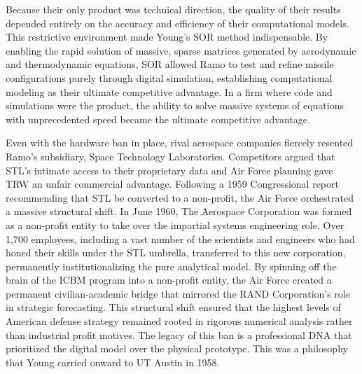 Because their only product was technical direction, the quality of their results depended entirely on the accuracy and efficiency of their computational models. This restrictive environment made Young's SOR method indispensable. By enabling the rapid solution of massive, sparse matrices generated by aerodynamic and thermodynamic equations, SOR allowed Ramo to test and refine missile configurations purely through digital simulation, establishing computational modeling as their ultimate competitive advantage. In a firm where code and simulations were the product, the ability to solve massive systems of equations with unprecedented speed became the ultimate competitive advantage. 

Even with the hardware ban in place, rival aerospace companies fiercely resented Ramo's subsidiary, Space Technology Laboratories. Competitors argued that STL's intimate access to their proprietary data and Air Force planning gave TRW an unfair commercial advantage. Following a 1959 Congressional report recommending that STL be converted to a non-profit, the Air Force orchestrated a massive structural shift. In June 1960, The Aerospace Corporation was formed as a non-profit entity to take over the impartial systems engineering role. Over 1,700 employees, including a vast number of the scientists and engineers who had honed their skills under the STL umbrella, transferred to this new corporation, permanently institutionalizing the pure analytical model. By spinning off the brain of the ICBM program into a non-profit entity, the Air Force created a permanent civilian-academic bridge that mirrored the RAND Corporation’s role in strategic forecasting. This structural shift ensured that the highest levels of American defense strategy remained rooted in rigorous numerical analysis rather than industrial profit motives. The legacy of this ban is a professional DNA that prioritized the digital model over the physical prototype. This was a philosophy that Young carried onward to UT Austin in 1958. 

